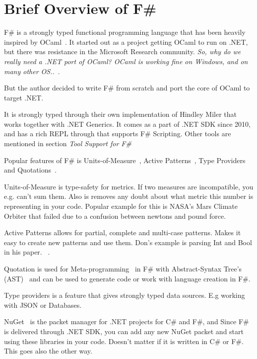 \documentclass[12pt]{article}
\begin{document}
\newpage

\section{Brief Overview of F\#}

F\# is a strongly typed functional programming language that has been heavily inspired by OCaml~\cite{noauthor_ocaml_nodate}. It started out as a project getting OCaml to run on .NET, but there was resistance in the Microsoft Research community. \textit{So, why do we really need a .NET port of OCaml? OCaml is working fine on Windows, and on many
other OS..}~\parencite[p 16]{syme_early_2020}.


But the author decided to write F\# from scratch and port the core of OCaml to target .NET.

It is strongly typed through their own implementation of Hindley Miler that works together with .NET Generics. It comes as a part of .NET SDK since 2010, and has a rich REPL through  that supports F\# Scripting. Other tools are mentioned in section \textit{Tool Support for F\#}

Popular features of F\# is Units-of-Measure~\cite{carter_units_nodate}, Active Patterns~\cite{carter_active_nodate}, Type Providers and Quotations~\cite{carter_code_nodate}.

Units-of-Measure is type-safety for metrics. If two measures are incompatible, you e.g. can't sum them.
Also is removes any doubt about what metric this number is representing in your code. Popular example for this is NASA's Mars Climate Orbiter that failed due to a confusion between newtons and pound force.~\cite{noauthor_mars_2021}

Active Patterns allows for partial, complete and multi-case patterns.
Makes it easy to create new patterns and use them. Don's example is parsing Int and Bool in his paper. ~\cite[p 29]{syme_early_2020}.

Quotation is used for Meta-programming~\cite{noauthor_metaprogramming_2021} in F\# with Abstract-Syntax Tree's (AST)~\cite{noauthor_abstract_2021} and can be used to generate code or work with language creation in F\#.

Type providers is a feature that gives strongly typed data sources.
E.g working with JSON or Databases.

NuGet~\cite{douglas_what_nodate} is the packet manager for .NET projects for C\# and F\#, and 
Since F\# is delivered through .NET SDK, you can add any new NuGet packet and start using these libraries in your code. Doesn't matter if it is written in C\# or F\#. This goes also the other way.
\end{document}
